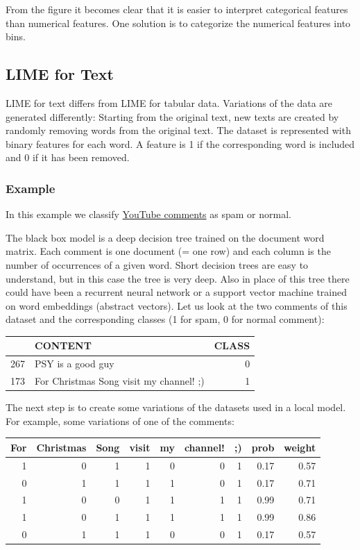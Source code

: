 \documentclass[
  10pt,
]{scrbook}
\begin{document}
From the figure it becomes clear that it is easier to interpret categorical features than numerical features.
One solution is to categorize the numerical features into bins.

\hypertarget{lime-for-text}{%
\subsection{LIME for Text}\label{lime-for-text}}

LIME for text differs from LIME for tabular data.
Variations of the data are generated differently:
Starting from the original text, new texts are created by randomly removing words from the original text.
The dataset is represented with binary features for each word.
A feature is 1 if the corresponding word is included and 0 if it has been removed.

\hypertarget{example-6}{%
\subsubsection{Example}\label{example-6}}

In this example we classify \protect\hyperlink{spam-data}{YouTube comments} as spam or normal.

The black box model is a deep decision tree trained on the document word matrix.
Each comment is one document (= one row) and each column is the number of occurrences of a given word.
Short decision trees are easy to understand, but in this case the tree is very deep.
Also in place of this tree there could have been a recurrent neural network or a support vector machine trained on word embeddings (abstract vectors).
Let us look at the two comments of this dataset and the corresponding classes (1 for spam, 0 for normal comment):

\begin{table}
\centering
\begin{tabular}{llr}
\toprule
  & CONTENT & CLASS\\
\midrule
267 & PSY is a good guy & 0\\
173 & For Christmas Song visit my channel! ;) & 1\\
\bottomrule
\end{tabular}
\end{table}

The next step is to create some variations of the datasets used in a local model.
For example, some variations of one of the comments:

\begin{table}
\centering
\begin{tabular}{rrrrrrrrr}
\toprule
For & Christmas & Song & visit & my & channel! & ;) & prob & weight\\
\midrule
1 & 0 & 1 & 1 & 0 & 0 & 1 & 0.17 & 0.57\\
0 & 1 & 1 & 1 & 1 & 0 & 1 & 0.17 & 0.71\\
1 & 0 & 0 & 1 & 1 & 1 & 1 & 0.99 & 0.71\\
1 & 0 & 1 & 1 & 1 & 1 & 1 & 0.99 & 0.86\\
0 & 1 & 1 & 1 & 0 & 0 & 1 & 0.17 & 0.57\\
\bottomrule
\end{tabular}
\end{table}
\end{document}
